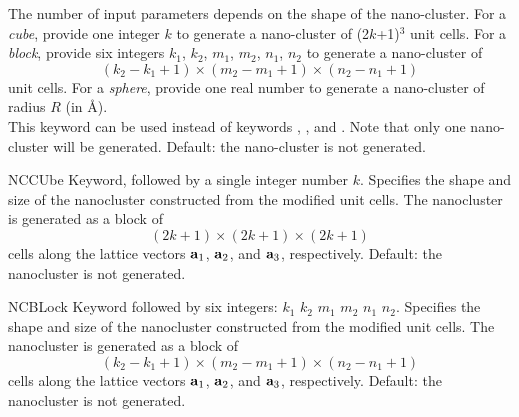 \begin{keywordlist}
The number of input parameters depends on the shape of the nano-cluster.
For a {\it cube}, provide one integer $k$ to generate a nano-cluster of (2$k$+1)$^3$ unit cells.
For a {\it block}, provide six integers $k_1$, $k_2$, $m_1$, $m_2$, $n_1$, $n_2$
to generate a nano-cluster of
$$ (k_2 - k_1 + 1) \times ( m_2 - m_1 + 1) \times (n_2 - n_1 + 1) $$
unit cells.  For a {\it sphere}, provide one real number to generate a nano-cluster of radius $R$ (in \AA). \\
This keyword can be used instead of keywords , , and . Note that only one nano-cluster will be generated.
Default: the nano-cluster is not generated.
\item[NCCUbe]
Keyword, followed by a single integer number $k$.
Specifies the shape and size of the nanocluster constructed from the modified unit cells.
The nanocluster is generated as a block of
$$ (2k+1)\times(2k+1)\times(2k+1) $$
cells along the lattice vectors ${\bf a}_1$, ${\bf a}_2$, and ${\bf a}_3$, respectively.
Default: the nanocluster is not generated.
\item[NCBLock]
Keyword followed by six integers: $k_1$ $k_2$ $m_1$ $m_2$ $n_1$ $n_2$.
Specifies the shape and size of the nanocluster constructed from the modified unit cells.
The nanocluster is generated as a block of
$$ (k_2-k_1+1)\times(m_2-m_1+1)\times(n_2-n_1+1) $$
cells along the lattice vectors ${\bf a}_1$, ${\bf a}_2$, and ${\bf a}_3$, respectively.
Default: the nanocluster is not generated.

\end{keywordlist}
